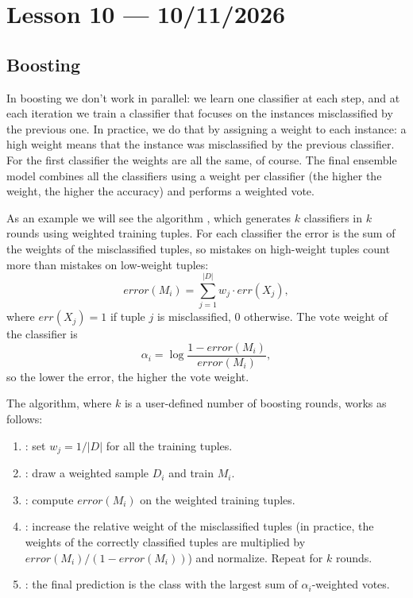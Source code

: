 \section{Lesson 10 --- 10/11/2026}

\subsection{Boosting}

In boosting we don't work in parallel: we learn one classifier at each step, and at each iteration we train a classifier that focuses on the instances misclassified by the previous one. In practice, we do that by assigning a weight to each instance: a high weight means that the instance was misclassified by the previous classifier. For the first classifier the weights are all the same, of course. The final ensemble model combines all the classifiers using a weight per classifier (the higher the weight, the higher the accuracy) and performs a weighted vote.

As an example we will see the algorithm , which generates $k$ classifiers in $k$ rounds using weighted training tuples. For each classifier the error is the sum of the weights of the misclassified tuples, so mistakes on high-weight tuples count more than mistakes on low-weight tuples:
\[
  error(M_i) = \sum_{j=1}^{|D|} w_j \cdot err(X_j),
\]
where $err(X_j) = 1$ if tuple $j$ is misclassified, $0$ otherwise. The vote weight of the classifier is
\[
  \alpha_i = \log\frac{1 - error(M_i)}{error(M_i)},
\]
so the lower the error, the higher the vote weight.

The algorithm, where $k$ is a user-defined number of boosting rounds, works as follows:
\begin{enumerate}
  \item {}: set $w_j = 1/|D|$ for all the training tuples.
  \item {}: draw a weighted sample $D_i$ and train $M_i$.
  \item {}: compute $error(M_i)$ on the weighted training tuples.
  \item {}: increase the relative weight of the misclassified tuples (in practice, the weights of the correctly classified tuples are multiplied by $error(M_i)/(1-error(M_i))$) and normalize. Repeat for $k$ rounds.
  \item {}: the final prediction is the class with the largest sum of $\alpha_i$-weighted votes.
\end{enumerate}

